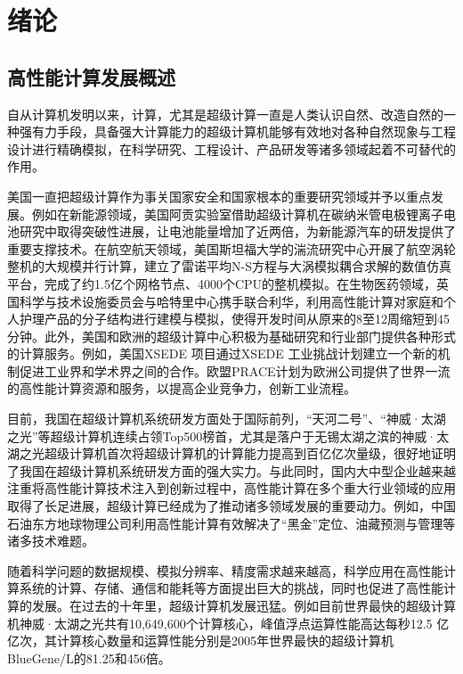 \chapter{绪论}

\section{高性能计算发展概述}

自从计算机发明以来，计算，尤其是超级计算一直是人类认识自然、改造自然的一种强有力手段，具备强大计算能力的超级计算机能够有效地对各种自然现象与工程设计进行精确模拟，在科学研究、工程设计、产品研发等诸多领域起着不可替代的作用。

美国一直把超级计算作为事关国家安全和国家根本的重要研究领域并予以重点发展。例如在新能源领域，美国阿贡实验室借助超级计算机在碳纳米管电极锂离子电池研究中取得突破性进展，让电池能量增加了近两倍，为新能源汽车的研发提供了重要支撑技术\cite{xiong2012self}。在航空航天领域，美国斯坦福大学的湍流研究中心开展了航空涡轮整机的大规模并行计算，建立了雷诺平均N-S方程与大涡模拟耦合求解的数值仿真平台，完成了约1.5亿个网格节点、4000个CPU的整机模拟\cite{reynolds2003aircraft}。在生物医药领域，英国科学与技术设施委员会与哈特里中心携手联合利华，利用高性能计算对家庭和个人护理产品的分子结构进行建模与模拟，使得开发时间从原来的8至12周缩短到45分钟\cite{Unilever}。此外，美国和欧洲的超级计算中心积极为基础研究和行业部门提供各种形式的计算服务。例如，美国XSEDE 项目通过XSEDE 工业挑战计划建立一个新的机制促进工业界和学术界之间的合作\cite{Unilever}。欧盟PRACE计划为欧洲公司提供了世界一流的高性能计算资源和服务\cite{PRACE}，以提高企业竞争力，创新工业流程。

目前，我国在超级计算机系统研发方面处于国际前列，“天河二号”\cite{tianhe-2}、“神威·太湖之光”\cite{fu2016sunway}等超级计算机连续占领Top500榜首，尤其是落户于无锡太湖之滨的神威·太湖之光超级计算机首次将超级计算机的计算能力提高到百亿亿次量级\cite{fu2016sunway}，很好地证明了我国在超级计算机系统研发方面的强大实力。与此同时，国内大中型企业越来越注重将高性能计算技术注入到创新过程中，高性能计算在多个重大行业领域的应用取得了长足进展，超级计算已经成为了推动诸多领域发展的重要动力。例如，中国石油东方地球物理公司利用高性能计算有效解决了“黑金”定位、油藏预测与管理等诸多技术难题\cite{luo2007hpc}。

随着科学问题的数据规模、模拟分辨率、精度需求越来越高，科学应用在高性能计算系统的计算、存储、通信和能耗等方面提出巨大的挑战，同时也促进了高性能计算的发展。在过去的十年里，超级计算机发展迅猛。例如目前世界最快的超级计算机神威·太湖之光共有10,649,600个计算核心，峰值浮点运算性能高达每秒12.5 亿亿次，其计算核心数量和运算性能分别是2005年世界最快的超级计算机BlueGene/L的81.25和456倍\cite{top5002015}。

